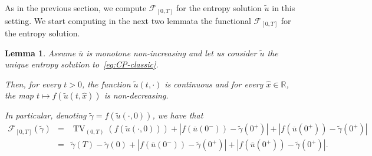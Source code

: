 \documentclass[a4paper, 10pt, final]{article}
\newtheorem{lemma}{Lemma}[section]
\newcommand{\R}{\mathbb{R}} \newcommand{\N}{\mathbb{N}}
\DeclareMathOperator{\tv}{TV}
\begin{document}
As in the previous section, we 
compute   $\mathcal{F}_{[0,T]}$ for the entropy solution $\widetilde u$ in this setting.
We  start computing in the next two lemmata the functional $\mathcal{F}_{[0,T]}$ for the entropy solution. 
 

\begin{lemma}\label{lemmafcrescente}
  Assume   $\overline u $ is monotone non-increasing and let us consider   $\widetilde u$   the unique entropy solution to~\eqref{eq:CP-classic}.
  
  Then, for every $t > 0$, 
  the function $\widetilde{u}(t, \cdot)$ is continuous and for every $\hat x \in \R$, 
  the map $t \mapsto f(\widetilde{u}(t, \hat{x}))$ is
  non-decreasing.
  
In particular, denoting $\widetilde\gamma=f(\widetilde u(\cdot, 0))$, we have that 
\begin{eqnarray*} \mathcal F_{[0, T]}(\widetilde\gamma)
    & = &
      \tv_{(0, T)}(f(\widetilde u(\cdot, 0)))
    +
    |f(\overline u(0^-))- \widetilde\gamma(0^+)| + 
    |f(\overline u(0^+))- \widetilde \gamma(0^+)| 
\\ &= &  \widetilde \gamma(T)- \widetilde \gamma(0) +
    |f(\overline u(0^-))- \widetilde\gamma(0^+)| + 
    |f(\overline u(0^+))- \widetilde \gamma(0^+)| . \end{eqnarray*}  
     
\end{lemma}
\end{document}
